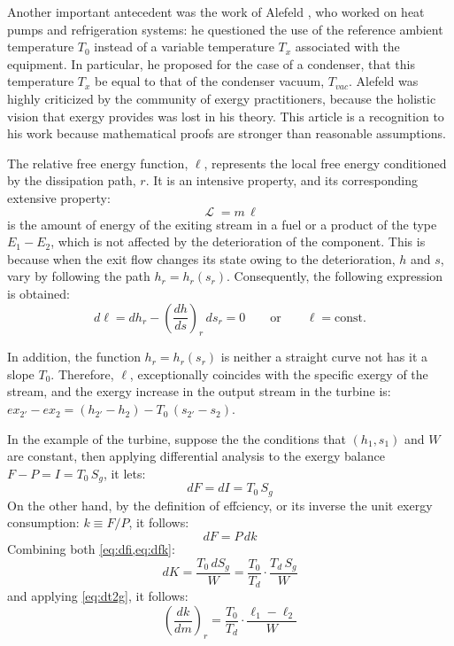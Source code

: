 \documentclass[energies,article,submit,moreauthors,pdftex]{Definitions/mdpi}
\DeclareMathOperator{\Lgdr}{\mathcal{L}}
\begin{document}
Another important antecedent was the work of Alefeld \cite{Alefeld1988}, who worked on heat pumps and refrigeration systems: he questioned the use of the reference ambient temperature $T_0$ instead of a variable temperature $T_x$ associated with the equipment. In particular, he proposed for the case of a condenser, that this temperature $T_x$ be equal to that of the condenser vacuum, $T_{vac}$. Alefeld was highly criticized by the community of exergy practitioners, because the holistic vision that exergy provides was lost in his theory. This article is a recognition to his work because mathematical proofs are stronger than reasonable assumptions.

The relative free energy function, $\ell$, represents the local free energy conditioned by the dissipation path, $r$. It is an intensive property, and its corresponding extensive property: 
\begin{equation}
\Lgdr = m\,\ell
\end{equation}                                                
is the amount of energy of the exiting stream in a fuel or a product of the type $E_1-E_2$, which is not affected by the deterioration of the component. This is because when the exit flow changes its state owing to the deterioration, $h$ and $s$, vary by following the path $h_r = h_r (s_r)$. Consequently, the following expression is obtained:
\begin{equation}
d\ell = dh_r - \left(\frac{dh}{ds}\right)_r\, ds_r = 0 \qquad  \text{or} \qquad \ell = \text{const}.
\end{equation}

In addition, the function $h_r = h_r(s_r)$ is neither a straight curve not has it a slope $T_0$. Therefore, $\ell$, exceptionally coincides with the specific exergy of the stream, and the exergy increase in the output stream in the turbine is: $ex_{2'}-ex_{2}=(h_{2'}-h_2)-T_0\,(s_{2'}-s_2)$.

In the example of the turbine, suppose the the conditions that $(h_1, s_1)$ and $W$ are constant, then applying differential analysis to the exergy balance $F-P=I=T_0\,S_g$, it lets:
\begin{equation}
dF=dI=T_0\,S_g
\label{eq:dfi}
\end{equation}
On the other hand, by the definition of effciency, or its inverse the unit exergy consumption: $k\equiv F/P$, it follows:
\begin{equation}
dF=P\,dk
\label{eq:dfk}
\end{equation}
Combining both \cref{eq:dfi,eq:dfk}:
\begin{equation}
dK=\frac{T_0\,dS_g}{W}=\frac{T_0}{T_d}\cdot\frac{T_d \, S_g}{W}
\end{equation}
and applying \cref{eq:dt2g}, it follows:
\begin{equation}
\left(\frac{dk}{dm}\right)_r = \frac{T_0}{T_d} \cdot \frac{\ell_1 - \ell_2}{W}
\end{equation}
\end{document}
